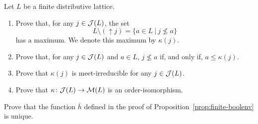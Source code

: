 \begin{exercise}\label{exe:kappa}
Let $L$ be a finite distributive lattice.
\begin{enumerate}
\item Prove that, for any $j \in \mathcal{J}(L)$, the set
\[ L \setminus ({\uparrow} j) = \{a \in L \ | \ j \nleq a\}\]
has a maximum. We denote this maximum by $\kappa(j)$.
\item Prove that, for any $j \in \mathcal{J}(L)$ and $a \in L$, $j \nleq a$ if, and only if, $a \leq \kappa(j)$.
\item Prove that $\kappa(j)$ is meet-irreducible for any $j \in \mathcal{J}(L)$.
\item Prove that $\kappa \colon \mathcal{J}(L) \to \mathcal{M}(L)$ is an order-isomorphism.
\end{enumerate}
\end{exercise}

\begin{exercise}\label{ex:unique-finite-boolean-envelope}
Prove that the function $\bar{h}$ defined in the proof of Proposition~\ref{prop:finite-boolenv} is unique. 
\end{exercise}

\theendnotes
\setcounter{endnote}{0}


